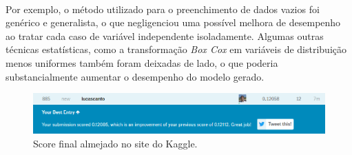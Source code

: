 \documentclass{article}
\begin{document}
	\paragraph{}Por exemplo, o  método utilizado para o preenchimento de dados vazios foi genérico e generalista, o que negligenciou uma possível melhora de desempenho ao tratar cada caso de variável independente isoladamente. Algumas outras técnicas estatísticas, como a transformação \textit{Box Cox} em variáveis de distribuição menos uniformes também foram deixadas de lado, o que poderia substancialmente aumentar o desempenho do modelo gerado.
	
	\begin{figure}[H]
		\centering
		\includegraphics[scale=0.6]{../img/final_score}
		\caption{Score final almejado no site do Kaggle.}
	\end{figure}
\end{document}
